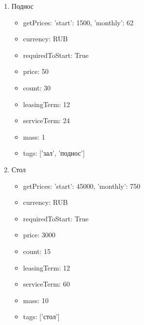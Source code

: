 \documentclass[a4paper,12pt]{article}
\begin{document}
\begin{enumerate}
      \item Поднос
        \begin{itemize}
        
          \item getPrices: {'start': 1500, 'monthly': 62}
        
          \item currency: RUB
        
          \item requiredToStart: True
        
          \item price: 50
        
          \item count: 30
        
          \item leasingTerm: 12
        
          \item serviceTerm: 24
        
          \item mass: 1
        
          \item tags: ['зал', 'поднос']
        
        \end{itemize}
      
      \item Стол
        \begin{itemize}
        
          \item getPrices: {'start': 45000, 'monthly': 750}
        
          \item currency: RUB
        
          \item requiredToStart: True
        
          \item price: 3000
        
          \item count: 15
        
          \item leasingTerm: 12
        
          \item serviceTerm: 60
        
          \item mass: 10
        
          \item tags: ['стол']
        

\end{itemize}
\end{enumerate}
\end{document}
